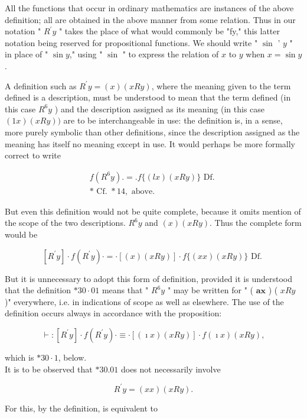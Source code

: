 \documentclass[10pt]{article}
\begin{document}
All the functions that occur in ordinary mathematics are instances of the above definition; all are obtained in the above manner from some relation. Thus in our notation " $R^{\prime} y$ " takes the place of what would commonly be "fy," this latter notation being reserved for propositional functions. We should write " $\sin$ ' $y$ " in place of " $\sin y$," using " $\sin$ " to express the relation of $x$ to $y$ when $x=\sin y$.

A definition such as $R^{\prime} y=(x)(x R y)$, where the meaning given to the term defined is a description, must be understood to mean that the term defined (in this case $R^{6} y$ ) and the description assigned as its meaning (in this case $(1 x)(x R y))$ are to be interchangeable in use: the definition is, in a sense, more purely symbolic than other definitions, since the description assigned as the meaning has itself no meaning except in use. It would perhaps be more formally correct to write

$$
\begin{gathered}
f\left(R^{6} y\right) .=. f\{(l x)(x R y)\} \text { Df. } \\
* \text { Cf. } * 14, \text { above. }
\end{gathered}
$$

But even this definition would not be quite complete, because it omits mention of the scope of the two descriptions. $R^{6} y$ and $(x)(x R y)$. Thus the complete form would be

$$
\left[R^{\prime} y\right] \cdot f\left(R^{\prime} y\right) \cdot=\cdot[(x)(x R y)] \cdot f\{(x x)(x R y)\} \text { Df. }
$$

But it is unnecessary to adopt this form of definition, provided it is understood that the definition $* 30 \cdot 01$ means that " $R^{6} y$ " may be written for " ( $\boldsymbol{a} \boldsymbol{x}$ ) ( $x R y$ )" everywhere, i.e. in indications of scope as well as elsewhere. The use of the definition occurs always in accordance with the proposition:

$$
\vdash:\left[R^{\prime} y\right] \cdot f\left(R^{\prime} y\right) \cdot \equiv \cdot[(\imath x)(x R y)] \cdot f(\imath x)(x R y),
$$

which is $* 30 \cdot 1$, below.\\
It is to be observed that $* 30.01$ does not necessarily involve

$$
R^{\prime} y=(x x)(x R y) .
$$

For this, by the definition, is equivalent to
\end{document}
